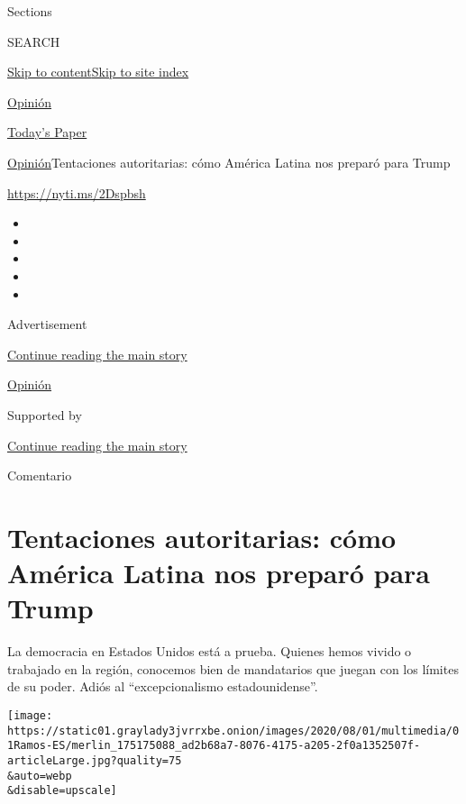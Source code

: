 Sections

SEARCH

\protect\hyperlink{site-content}{Skip to
content}\protect\hyperlink{site-index}{Skip to site index}

\href{https://www.nytimes3xbfgragh.onion/es/section/opinion}{Opinión}

\href{https://myaccount.nytimes3xbfgragh.onion/auth/login?response_type=cookie\&client_id=vi}{}

\href{https://www.nytimes3xbfgragh.onion/section/todayspaper}{Today's
Paper}

\href{/es/section/opinion}{Opinión}\textbar{}Tentaciones autoritarias:
cómo América Latina nos preparó para Trump

\url{https://nyti.ms/2Dspbsh}

\begin{itemize}
\item
\item
\item
\item
\item
\end{itemize}

Advertisement

\protect\hyperlink{after-top}{Continue reading the main story}

\href{/es/section/opinion}{Opinión}

Supported by

\protect\hyperlink{after-sponsor}{Continue reading the main story}

Comentario

\hypertarget{tentaciones-autoritarias-cuxf3mo-amuxe9rica-latina-nos-preparuxf3-para-trump}{%
\section{Tentaciones autoritarias: cómo América Latina nos preparó para
Trump}\label{tentaciones-autoritarias-cuxf3mo-amuxe9rica-latina-nos-preparuxf3-para-trump}}

La democracia en Estados Unidos está a prueba. Quienes hemos vivido o
trabajado en la región, conocemos bien de mandatarios que juegan con los
límites de su poder. Adiós al ``excepcionalismo estadounidense''.

\texttt{[image: https://static01.graylady3jvrrxbe.onion/images/2020/08/01/multimedia/01Ramos-ES/merlin\_175175088\_ad2b68a7-8076-4175-a205-2f0a1352507f-articleLarge.jpg?quality=75\\\&auto=webp\\\&disable=upscale]}

